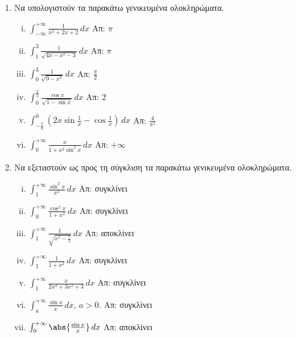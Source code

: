 


\everymath{\displaystyle}



\begin{center}
\end{center}

\vspace{\baselineskip}

\begin{enumerate}
	\item Να υπολογιστούν τα παρακάτω γενικευμένα ολοκληρώματα.

		\begin{enumerate}[i)]
			\item $ \int _{-\infty}^{+\infty} \frac{1}{x^{2}+2x+2} \,{dx} $
				\hfill Απ: $ \pi $
			\item $ \int _{1}^{3} \frac{1}{\sqrt{4x-x^{2}-3}} \,{dx} $ \hfill
				Απ: $ \pi $
			\item $ \int _{0}^{3} \frac{1}{\sqrt{9-x^{2}}} \,{dx} $ \hfill Απ: $
				\frac{\pi}{2} $
			\item $ \int _{0}^{\frac{\pi}{2}} \frac{\cos{x}}{\sqrt{1 - \sin{x}}}\,{dx} $
				\hfill Απ: $ 2 $
			\item $ \int_{-\frac{2}{\pi}}^{0} \left(2x \sin{\frac{1}{x}} - 
				\cos{\frac{1}{x}}\right) \,{dx} $ \hfill Απ: $ \frac{4}{\pi ^{2}} $
			\item $ \int _{0}^{+\infty} \frac{x}{1+x^{2} \sin^{2}{x}}  \,{dx} $
				\hfill Απ: $ +\infty $
		\end{enumerate}

	\item Να εξεταστούν ως προς τη σύγκλιση τα παρακάτω γενικευμένα
		ολοκληρώματα.

		\begin{enumerate}[i)]
			\item $ \int_{1}^{+\infty} \frac{\sin^{2}{x}}{x^{2}} \,{dx} $ \hfill Απ: συγκλίνει
			\item $ \int _{0}^{+\infty} \frac{\cos^{2}{x}}{1+x^{2}} \,{dx} $
				\hfill Απ: συγκλίνει
			\item $ \int_{1}^{+\infty} \frac{1}{\sqrt{x^{2} - \frac{1}{2}}} \,{dx}  $
				\hfill Απ: αποκλίνει
			\item $ \int_{1}^{+\infty} \frac{1}{1+x^{2}} \,{dx} $ \hfill Απ: συγκλίνει
			\item $ \int _{1}^{+\infty} \frac{x}{2x^{4}+3x^{2}+3} \,{dx} $
				\hfill Απ: συγκλίνει
			\item $ \int _{a}^{+\infty} \frac{\sin{x}}{x} \,{dx}$, $ a>0 $.
				\hfill Απ: συγκλίνει
			\item $ \int _{0}^{+\infty}	\abs{\frac{\sin{x}}{x}} \,{dx} $ \hfill
				Απ: αποκλίνει
		\end{enumerate}


\end{enumerate}
